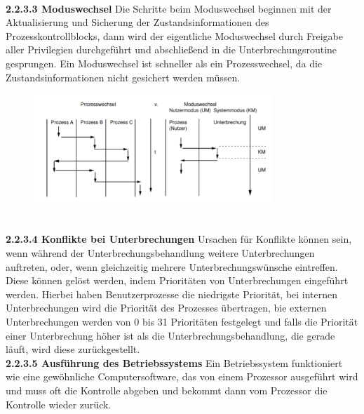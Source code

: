 \documentclass{article}
\begin{document}
    \\
    \textbf{2.2.3.3 Moduswechsel}\newline
    Die Schritte beim Moduswechsel beginnen mit der Aktualisierung und Sicherung der Zustandsinformationen des Prozesskontrollblocks, dann wird der eigentliche Moduswechsel durch Freigabe aller Privilegien durchgeführt und abschließend in die Unterbrechungsroutine gesprungen. Ein Moduswechsel ist schneller als ein Prozesswechsel, da die Zustandsinformationen nicht gesichert werden müssen.\newline
    \begin{figure}[h]
        \centering
	    \includegraphics[width=90mm]{Skizzen/2_Kapitel/Prozess_Moduswechsel.png}
    \end{figure}
    \\
    \textbf{2.2.3.4 Konflikte bei Unterbrechungen}\newline
    Ursachen für Konflikte können sein, wenn während der Unterbrechungsbehandlung weitere Unterbrechungen auftreten, oder, wenn gleichzeitig mehrere Unterbrechungswünsche eintreffen.\newline
    Diese können gelöst werden, indem Prioritäten von Unterbrechungen eingeführt werden. Hierbei haben Benutzerprozesse die niedrigste Priorität, bei internen Unterbrechungen wird die Priorität des Prozesses übertragen, bie externen Unterbrechungen werden von 0 bis 31 Prioritäten festgelegt und falls die Priorität einer Unterbrechung höher ist als die Unterbrechungsbehandlung, die gerade läuft, wird diese zurückgestellt.\newline
    \\
    \textbf{2.2.3.5 Ausführung des Betriebssystems}\newline
    Ein Betriebssystem funktioniert wie eine gewöhnliche Computersoftware, das von einem Prozessor ausgeführt wird und muss oft die Kontrolle abgeben und bekommt dann vom Prozessor die Kontrolle wieder zurück. \newline
\end{document}
